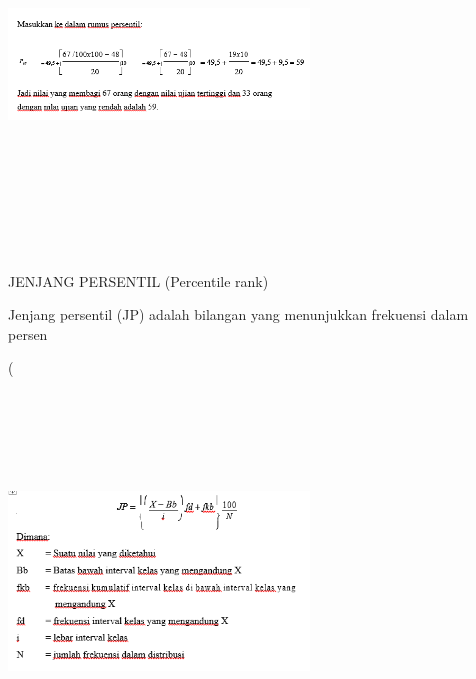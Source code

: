 \documentclass[11pt,fleqn]{book} %
\begin{document}
{\includegraphics[width = 8cm, height= 10cm]{Pictures/rizkie10.png}

JENJANG PERSENTIL (Percentile rank)

Jenjang persentil (JP) adalah bilangan yang menunjukkan frekuensi dalam persen

(%

\includegraphics[width = 8cm, height= 10cm]{Pictures/rizkie11.png}

}
\end{document}
